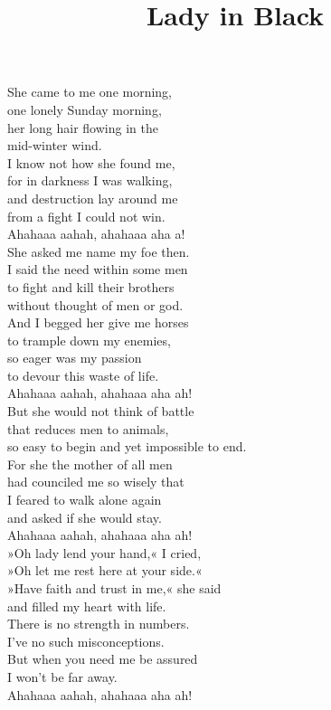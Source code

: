 \title{Lady in Black} 

She  came to me one morning, \\ 
one lonely Sunday morning, \\ 
her  long hair flowing in the \\ 
 mid-winter wind. \\ 
I  know not how she found me, \\ 
for in darkness I was walking, \\ 
and  destruction lay around me \\ 
from a  fight I could not win. \\ 
 Ahahaaa  aahah,  ahahaaa  aha  a! \\ 

She  asked me name my foe then. \\ 
I said the need within some men \\ 
to  fight and kill their brothers \\ 
without  thought of men or god. \\ 
And I  begged her give me horses \\ 
to trample down my enemies, \\ 
so  eager was my passion \\ 
to  devour this waste of life. \\ 
 Ahahaaa  aahah,  ahahaaa  aha  ah! \\ 

But  she would not think of battle \\ 
that reduces men to animals, \\ 
so  easy to begin and yet  impossible to end. \\ 
For  she the mother of all men \\ 
had counciled me so wisely that \\ 
I  feared to walk alone again \\ 
and  asked if she would stay. \\ 
 Ahahaaa  aahah,  ahahaaa  aha  ah! \\ 

»Oh  lady lend your hand,« I cried, \\ 
»Oh let me rest here at your side.« \\ 
»Have  faith and trust in me,« she said \\ 
and  filled my heart with life. \\ 
There is no strength in numbers. \\ 
I’ve no such misconceptions. \\ 
But  when you need me be assured \\ 
I  won’t be far away. \\ 
 Ahahaaa  aahah,  ahahaaa  aha  ah!

